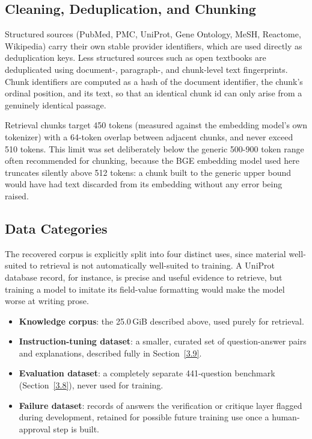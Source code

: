 \subsection{Cleaning, Deduplication, and Chunking}\label{3.2.2}

Structured sources (PubMed, PMC, UniProt, Gene Ontology, MeSH, Reactome,
Wikipedia) carry their own stable provider identifiers, which are used
directly as deduplication keys. Less structured sources such as open
textbooks are deduplicated using document-, paragraph-, and chunk-level
text fingerprints. Chunk identifiers are computed as a hash of the
document identifier, the chunk's ordinal position, and its text, so that an
identical chunk id can only arise from a genuinely identical passage.

Retrieval chunks target 450 tokens (measured against the embedding
model's own tokenizer) with a 64-token overlap between adjacent chunks, and
never exceed 510 tokens. This limit was set deliberately below the
generic 500-900 token range often recommended for chunking, because the
BGE embedding model used here truncates silently above 512 tokens: a
chunk built to the generic upper bound would have had text discarded from
its embedding without any error being raised.

\subsection{Data Categories}\label{3.2.3}

The recovered corpus is explicitly split into four distinct uses, since
material well-suited to retrieval is not automatically well-suited to
training. A UniProt database record, for instance, is precise and useful
evidence to retrieve, but training a model to imitate its field-value
formatting would make the model worse at writing prose.

\begin{itemize}
    \item \textbf{Knowledge corpus}: the 25.0\,GiB described above, used
        purely for retrieval.
    \item \textbf{Instruction-tuning dataset}: a smaller, curated set of
        question-answer pairs and explanations, described fully in
        Section~\ref{3.9}.
    \item \textbf{Evaluation dataset}: a completely separate 441-question
        benchmark (Section~\ref{3.8}), never used for training.
    \item \textbf{Failure dataset}: records of answers the verification
        or critique layer flagged during development, retained for possible
        future training use once a human-approval step is built.
\end{itemize}

